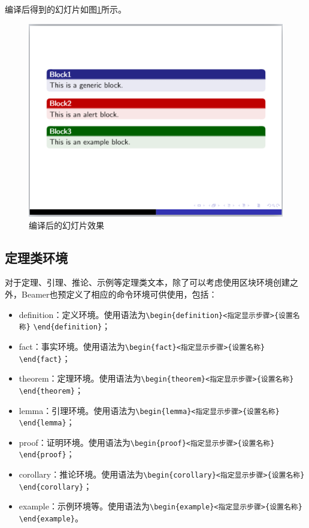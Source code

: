 编译后得到的幻灯片如图\ref{fig:917}所示。

\begin{figure}[htbp]
    \centering
    \includegraphics[width = 0.6\linewidth]{images/ch_9/NEWexample05.png}
    \caption{编译后的幻灯片效果}
    \label{fig:917}
\end{figure}

\subsection{定理类环境}

对于定理、引理、推论、示例等定理类文本，除了可以考虑使用区块环境创建之外，Beamer也预定义了相应的命令环境可供使用，包括：
\begin{itemize}
    \item definition：定义环境。使用语法为\texttt{\textbackslash{}begin\{definition\}<指定显示步骤>\{设置名称\}} \texttt{\textbackslash{}end\{definition\}}；
    \item fact：事实环境。使用语法为\texttt{\textbackslash{}begin\{fact\}<指定显示步骤>\{设置名称\}} \texttt{\textbackslash{}end\{fact\}}；
    \item theorem：定理环境。使用语法为\texttt{\textbackslash{}begin\{theorem\}<指定显示步骤>\{设置名称\}} \texttt{\textbackslash{}end\{theorem\}}；
    \item lemma：引理环境。使用语法为\texttt{\textbackslash{}begin\{lemma\}<指定显示步骤>\{设置名称\}} \texttt{\textbackslash{}end\{lemma\}}；
    \item proof：证明环境。使用语法为\texttt{\textbackslash{}begin\{proof\}<指定显示步骤>\{设置名称\}} \texttt{\textbackslash{}end\{proof\}}；
    \item corollary：推论环境。使用语法为\texttt{\textbackslash{}begin\{corollary\}<指定显示步骤>\{设置名称\}} \texttt{\textbackslash{}end\{corollary\}}；
    \item example：示例环境等。使用语法为\texttt{\textbackslash{}begin\{example\}<指定显示步骤>\{设置名称\}} \texttt{\textbackslash{}end\{example\}}。
\end{itemize}

